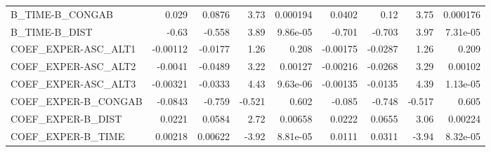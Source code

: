 \begin{tabular}{lrrrrrrrr}
B\_TIME-B\_CONGAB     &       0.029 &       0.0876 &    3.73 & 0.000194 &     0.0402 &        0.12 &         3.75 &      0.000176 \\
B\_TIME-B\_DIST       &       -0.63 &       -0.558 &    3.89 & 9.86e-05 &     -0.701 &      -0.703 &         3.97 &      7.31e-05 \\
COEF\_EXPER-ASC\_ALT1 &    -0.00112 &      -0.0177 &    1.26 &    0.208 &   -0.00175 &     -0.0287 &         1.26 &         0.209 \\
COEF\_EXPER-ASC\_ALT2 &     -0.0041 &      -0.0489 &    3.22 &  0.00127 &   -0.00216 &     -0.0268 &         3.29 &       0.00102 \\
COEF\_EXPER-ASC\_ALT3 &    -0.00321 &      -0.0333 &    4.43 & 9.63e-06 &   -0.00135 &     -0.0135 &         4.39 &      1.13e-05 \\
COEF\_EXPER-B\_CONGAB &     -0.0843 &       -0.759 &  -0.521 &    0.602 &     -0.085 &      -0.748 &       -0.517 &         0.605 \\
COEF\_EXPER-B\_DIST   &      0.0221 &       0.0584 &    2.72 &  0.00658 &     0.0222 &      0.0655 &         3.06 &       0.00224 \\
COEF\_EXPER-B\_TIME   &     0.00218 &      0.00622 &   -3.92 & 8.81e-05 &     0.0111 &      0.0311 &        -3.94 &      8.32e-05 \\
\bottomrule
\end{tabular}
